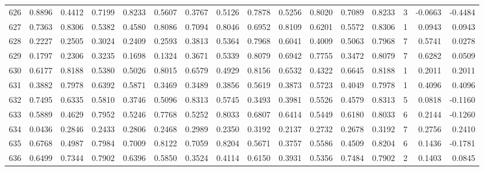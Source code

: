 \begin{tabular}{lrrrrrrrrrrrrrrr}
626 &      0.8896 &  0.4412 &  0.7199 &  0.8233 &  0.5607 &  0.3767 &  0.5126 &  0.7878 &  0.5256 &  0.8020 &   0.7089 &     0.8233 &      3 &                   -0.0663 &                    -0.4484 \\
627 &      0.7363 &  0.8306 &  0.5382 &  0.4580 &  0.8086 &  0.7094 &  0.8046 &  0.6952 &  0.8109 &  0.6201 &   0.5572 &     0.8306 &      1 &                    0.0943 &                     0.0943 \\
628 &      0.2227 &  0.2505 &  0.3024 &  0.2409 &  0.2593 &  0.3813 &  0.5364 &  0.7968 &  0.6041 &  0.4009 &   0.5063 &     0.7968 &      7 &                    0.5741 &                     0.0278 \\
629 &      0.1797 &  0.2306 &  0.3235 &  0.1698 &  0.1324 &  0.3671 &  0.5339 &  0.8079 &  0.6942 &  0.7755 &   0.3472 &     0.8079 &      7 &                    0.6282 &                     0.0509 \\
630 &      0.6177 &  0.8188 &  0.5380 &  0.5026 &  0.8015 &  0.6579 &  0.4929 &  0.8156 &  0.6532 &  0.4322 &   0.6645 &     0.8188 &      1 &                    0.2011 &                     0.2011 \\
631 &      0.3882 &  0.7978 &  0.6392 &  0.5871 &  0.3469 &  0.3489 &  0.3856 &  0.5619 &  0.3873 &  0.5723 &   0.4049 &     0.7978 &      1 &                    0.4096 &                     0.4096 \\
632 &      0.7495 &  0.6335 &  0.5810 &  0.3746 &  0.5096 &  0.8313 &  0.5745 &  0.3493 &  0.3981 &  0.5526 &   0.4579 &     0.8313 &      5 &                    0.0818 &                    -0.1160 \\
633 &      0.5889 &  0.4629 &  0.7952 &  0.5246 &  0.7768 &  0.5252 &  0.8033 &  0.6807 &  0.6414 &  0.5449 &   0.6180 &     0.8033 &      6 &                    0.2144 &                    -0.1260 \\
634 &      0.0436 &  0.2846 &  0.2433 &  0.2806 &  0.2468 &  0.2989 &  0.2350 &  0.3192 &  0.2137 &  0.2732 &   0.2678 &     0.3192 &      7 &                    0.2756 &                     0.2410 \\
635 &      0.6768 &  0.4987 &  0.7984 &  0.7009 &  0.8122 &  0.7059 &  0.8204 &  0.5671 &  0.3757 &  0.5586 &   0.4509 &     0.8204 &      6 &                    0.1436 &                    -0.1781 \\
636 &      0.6499 &  0.7344 &  0.7902 &  0.6396 &  0.5850 &  0.3524 &  0.4114 &  0.6150 &  0.3931 &  0.5356 &   0.7484 &     0.7902 &      2 &                    0.1403 &                     0.0845 \\

\end{tabular}
